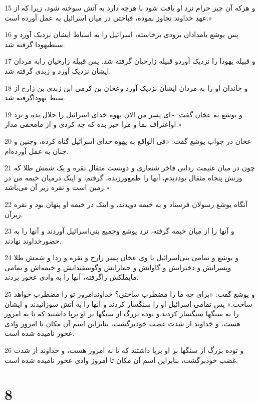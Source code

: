 \par 15 و هر‌که آن چیز حرام نزد او یافت شود با هر‌چه دارد به آتش سوخته شود، زیرا که از عهد خداوند تجاوز نموده، قباحتی در میان اسرائیل به عمل آورده است.»
\par 16 پس یوشع بامدادان بزودی برخاسته، اسرائیل را به اسباط ایشان نزدیک آورد و سبطیهودا گرفته شد.
\par 17 و قبیله یهودا را نزدیک آوردو قبیله زارحیان گرفته شد. پس قبیله زارحیان رابه مردان ایشان نزدیک آورد و زبدی گرفته شد. 
\par 18 و خاندان او را به مردان ایشان نزدیک آورد وعخان بن کرمی ابن زبدی بن زارح از سبط یهوداگرفته شد.
\par 19 و یوشع به عخان گفت: «ای پسر من الان یهوه خدای اسرائیل را جلال بده و نزد اواعتراف نما و مرا خبر بده که چه کردی و از مامخفی مدار.»
\par 20 عخان در جواب یوشع گفت: «فی الواقع به یهوه خدای اسرائیل گناه کرده، وچنین و چنان به عمل آورده‌ام.
\par 21 چون در میان غنیمت ردایی فاخر شنعاری و دویست مثقال نقره و یک شمش طلا که وزنش پنجاه مثقال بوددیدم، آنها را طمع‌ورزیده، گرفتم، و اینک درمیان خیمه من در زمین است و نقره زیر آن می‌باشد.»
\par 22 آنگاه یوشع رسولان فرستاد و به خیمه دویدند، و اینک در خیمه او پنهان بود و نقره زیرآن.
\par 23 و آنها را از میان خیمه گرفته، نزد یوشع وجمیع بنی‌اسرائیل آوردند و آنها را به حضورخداوند نهادند.
\par 24 و یوشع و تمامی بنی‌اسرائیل با وی عخان پسر زارح و نقره و ردا و شمش طلا وپسرانش و دخترانش و گاوانش و حمارانش وگوسفندانش و خیمه‌اش و تمامی مایملکش راگرفته، آنها را به وادی عخور بردند.
\par 25 و یوشع گفت: «برای چه ما را مضطرب ساختی؟ خداوندامروز تو را مضطرب خواهد ساخت.» پس تمامی اسرائیل او را سنگسار کردند و آنها را به آتش سوزانیدند و ایشان را به سنگها سنگسار کردند.و توده بزرگ از سنگها بر او برپا داشتند که تا به امروز هست، و خداوند از شدت غضب خودبرگشت، بنابراین اسم آن مکان تا امروز وادی عخور نامیده شده است.
\par 26 و توده بزرگ از سنگها بر او برپا داشتند که تا به امروز هست، و خداوند از شدت غضب خودبرگشت، بنابراین اسم آن مکان تا امروز وادی عخور نامیده شده است.
 
\chapter{8}

